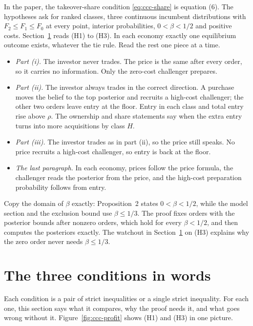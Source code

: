 In the paper, the takeover-share condition \eqref{eq:ccc-share} is equation (6). The hypotheses ask for ranked
classes, three continuous incumbent distributions with \(F_2\le F_1\le F_0\) at every point, interior
probabilities, \(0<\beta<1/2\) and positive costs. Section~\ref{sec:ccc-conditions} reads (H1) to (H3). In each
economy exactly one equilibrium outcome exists, whatever the tie rule. Read the rest one piece at a time.
\begin{itemize}
\item \emph{Part (i).} The investor never trades. The price is the same after every order, so it carries no
  information. Only the zero-cost challenger prepares.
\item \emph{Part (ii).} The investor always trades in the correct direction. A purchase moves the belief to the
  top posterior and recruits a high-cost challenger; the other two orders leave entry at the floor. Entry in each
  class and total entry rise above \(\rho\). The ownership and share statements say when the extra entry turns
  into more acquisitions by class \(H\).
\item \emph{Part (iii).} The investor trades as in part (ii), so the price still speaks. No price recruits a
  high-cost challenger, so entry is back at the floor.
\item \emph{The last paragraph.} In each economy, prices follow the price formula, the challenger reads the
  posterior from the price, and the high-cost preparation probability follows from entry.
\end{itemize}

\begin{watchout}
Copy the domain of \(\beta\) exactly: Proposition~2 states \(0<\beta<1/2\), while the model section and the
exclusion bound use \(\beta\le1/3\). The proof fixes orders with the posterior bounds after nonzero orders, which
hold for every \(\beta<1/2\), and then computes the posteriors exactly. The watchout in
Section~\ref{sec:ccc-conditions} on (H3) explains why the zero order never needs \(\beta\le1/3\).
\end{watchout}

\section{The three conditions in words}\label{sec:ccc-conditions}

Each condition is a pair of strict inequalities or a single strict inequality. For each one, this section says
what it compares, why the proof needs it, and what goes wrong without it. Figure~\ref{fig:ccc-profit} shows (H1) and
(H3) in one picture.

